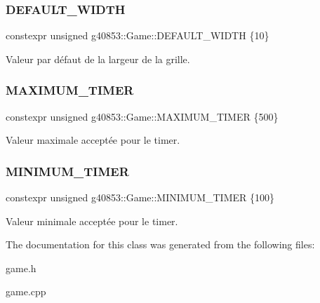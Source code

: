 \subsubsection{\texorpdfstring{D\+E\+F\+A\+U\+L\+T\+\_\+\+W\+I\+D\+TH}{DEFAULT\_WIDTH}}
{\footnotesize\ttfamily constexpr unsigned g40853\+::\+Game\+::\+D\+E\+F\+A\+U\+L\+T\+\_\+\+W\+I\+D\+TH \{10\}\hspace{0.3cm}{\ttfamily [static]}}

Valeur par défaut de la largeur de la grille. \hypertarget{classg40853_1_1_game_a2c93c2b51067295a9cd123e6f695cb6c}{}\label{classg40853_1_1_game_a2c93c2b51067295a9cd123e6f695cb6c} 
\subsubsection{\texorpdfstring{M\+A\+X\+I\+M\+U\+M\+\_\+\+T\+I\+M\+ER}{MAXIMUM\_TIMER}}
{\footnotesize\ttfamily constexpr unsigned g40853\+::\+Game\+::\+M\+A\+X\+I\+M\+U\+M\+\_\+\+T\+I\+M\+ER \{500\}\hspace{0.3cm}{\ttfamily [static]}}

Valeur maximale acceptée pour le timer. \hypertarget{classg40853_1_1_game_aa81c1dc7c89987f361e55fdd0117713d}{}\label{classg40853_1_1_game_aa81c1dc7c89987f361e55fdd0117713d} 
\subsubsection{\texorpdfstring{M\+I\+N\+I\+M\+U\+M\+\_\+\+T\+I\+M\+ER}{MINIMUM\_TIMER}}
{\footnotesize\ttfamily constexpr unsigned g40853\+::\+Game\+::\+M\+I\+N\+I\+M\+U\+M\+\_\+\+T\+I\+M\+ER \{100\}\hspace{0.3cm}{\ttfamily [static]}}

Valeur minimale acceptée pour le timer. 

The documentation for this class was generated from the following files\+:\begin{DoxyCompactItemize}
\item 
game.\+h\item 
game.\+cpp\end{DoxyCompactItemize}
